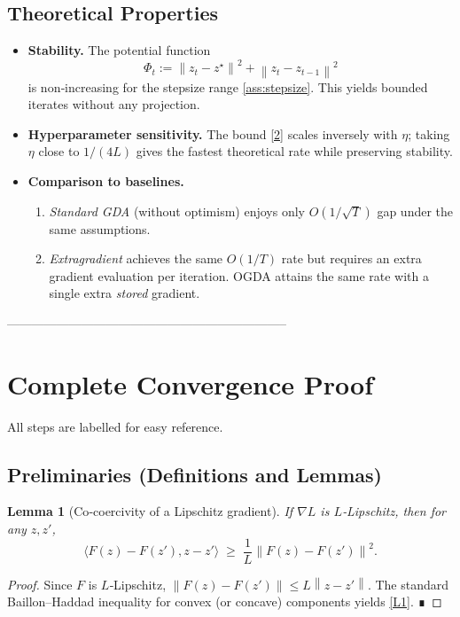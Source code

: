 \documentclass[11pt]{article}
\newtheorem{lemma}{Lemma}
\newcommand{\norm}[1]{\left\lVert #1\right\rVert}
\newcommand{\ip}[2]{\langle #1,#2\rangle}
\begin{document}
\subsection*{Theoretical Properties}
\begin{itemize}
\item \textbf{Stability.} The potential function 
\[
\Phi_t:=\norm{z_t-z^\star}^2+\norm{z_t-z_{t-1}}^2
\]
is non‑increasing for the stepsize range \eqref{ass:stepsize}. This yields bounded iterates without any projection.
\item \textbf{Hyperparameter sensitivity.} The bound \eqref{2} scales inversely with $\eta$; taking $\eta$ close to $1/(4L)$ gives the fastest theoretical rate while preserving stability.
\item \textbf{Comparison to baselines.}
    \begin{enumerate}
        \item \emph{Standard GDA} (without optimism) enjoys only $O(1/\sqrt{T})$ gap under the same assumptions.
        \item \emph{Extragradient} achieves the same $O(1/T)$ rate but requires an extra gradient evaluation per iteration. OGDA attains the same rate with a single extra \emph{stored} gradient.
    \end{enumerate}
\end{itemize}

--------------------------------------------------------------------

\section*{Complete Convergence Proof}

All steps are labelled for easy reference.

\subsection*{Preliminaries (Definitions and Lemmas)}
\begin{lemma}[Co‑coercivity of a Lipschitz gradient]\label{lem:coercive}
If $\nabla L$ is $L$‑Lipschitz, then for any $z,z'$,
\[
\ip{F(z)-F(z')}{z-z'}\;\ge\;\frac{1}{L}\norm{F(z)-F(z')}^2.
\tag{L1}
\]
\end{lemma}
\begin{proof}
Since $F$ is $L$‑Lipschitz, $\norm{F(z)-F(z')}\le L\norm{z-z'}$. The standard Baillon–Haddad inequality for convex (or concave) components yields \eqref{L1}. ∎
\end{proof}
\end{document}
